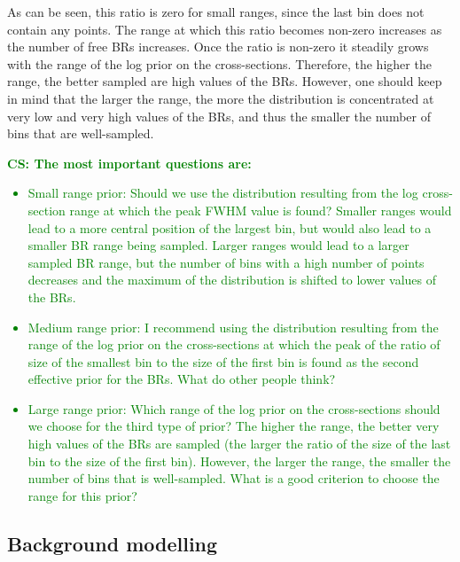 \documentclass{article}
\newcommand{\cs}[1]{\textcolor{green}{{\bf CS: #1}}}
\begin{document}
As can be seen, this ratio is zero for small ranges, since the last bin does not contain any points. The range at which this ratio becomes non-zero increases as the number of free BRs increases. Once the ratio is non-zero it steadily grows with the range of the log prior on the cross-sections. Therefore, the higher the range, the better sampled are high values of the BRs. However, one should keep in mind that the larger the range, the more the distribution is concentrated at very low and very high values of the BRs, and thus the smaller the number of bins that are well-sampled.

\cs{The most important questions are:
\begin{itemize}
	\item Small range prior: Should we use the distribution resulting from the log cross-section range at which the peak FWHM value is found? Smaller ranges would lead to a more central position of the largest bin, but would also lead to a smaller BR range being sampled. Larger ranges would lead to a larger sampled BR range, but the number of bins with a high number of points decreases and the maximum of the distribution is shifted to lower values of the BRs.
	\item Medium range prior: I recommend using the distribution resulting from the range of the log prior on the cross-sections at which the peak of the ratio of size of the smallest bin to the size of the first bin is found as the second effective prior for the BRs. What do other people think?
	\item Large range prior: Which range of the log prior on the cross-sections should we choose for the third type of prior? The higher the range, the better very high values of the BRs are sampled (the larger the ratio of the size of the last bin to the size of the first bin). However, the larger the range, the smaller the number of bins that is well-sampled. What is a good criterion to choose the range for this prior?
\end{itemize}
}

\subsection{Background modelling}
\end{document}
